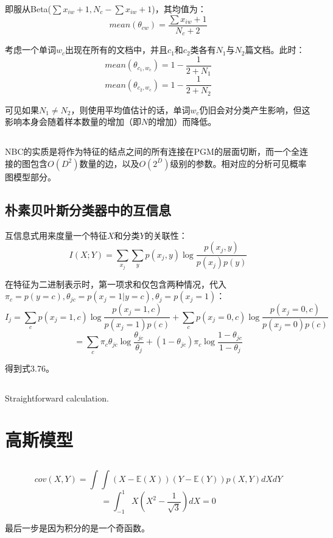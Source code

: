 \documentclass[UTF8]{ctexart}
\begin{document}
即服从Beta($\sum x_{iw} + 1,N_{c}-\sum x_{iw} + 1$)，其均值为：
$$mean(\theta_{cw})=\frac{\sum x_{iw} + 1}{N_{c} + 2}$$

考虑一个单词$w_{c}$出现在所有的文档中，并且$c_{1}$和$c_{2}$类各有$N_{1}$与$N_{2}$篇文档。此时：
$$mean(\theta_{c_{1},w_{c}})=1-\frac{1}{2+N_{1}}$$
$$mean(\theta_{c_{2},w_{c}})=1-\frac{1}{2+N_{2}}$$

可见如果$N_{1} \neq N_{2}$，则使用平均值估计的话，单词$w_{c}$仍旧会对分类产生影响，但这影响本身会随着样本数量的增加（即$N$的增加）而降低。

\subsection{}
NBC的实质是将作为特征的结点之间的所有连接在PGM的层面切断，而一个全连接的图包含$O(D^{2})$数量的边，以及$O(2^{D})$级别的参数。相对应的分析可见概率图模型部分。

\subsection{朴素贝叶斯分类器中的互信息}
互信息式用来度量一个特征$X$和分类$Y$的关联性：
$$I(X;Y)=\sum_{x_{j}}\sum_{y}p(x_{j},y)\log \frac{p(x_{j},y)}{p(x_{j})p(y)}$$

在特征为二进制表示时，第一项求和仅包含两种情况，代入$\pi_{c}=p(y=c),\theta_{jc}=p(x_{j}=1|y=c),\theta_{j}=p(x_{j}=1)$：
$$I_{j}=\sum_{c}p(x_{j}=1,c)\log \frac{p(x_{j}=1,c)}{p(x_{j}=1)p(c)} + \sum_{c}p(x_{j}=0,c)\log \frac{p(x_{j}=0,c)}{p(x_{j}=0)p(c)}$$
$$=\sum_{c}\pi_{c}\theta_{jc} \log \frac{\theta_{jc}}{\theta_{j}} + (1-\theta_{jc})\pi_{c} \log \frac{1-\theta_{jc}}{1-\theta_{j}}$$

得到式3.76。

\subsection{}
Straightforward calculation.

\newpage
\section{高斯模型}
\subsection{}
$$cov(X,Y)=\int\int (X-\mathbb{E}(X))(Y-\mathbb{E}(Y)) p(X,Y)dXdY$$
$$=\int_{-1}^{1}X(X^{2}-\frac{1}{\sqrt{3}})dX=0$$

最后一步是因为积分的是一个奇函数。
\end{document}
